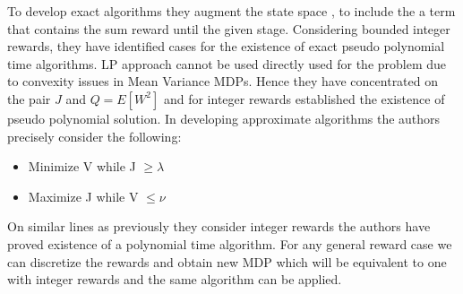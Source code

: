 \documentclass[12pt,a4paper,oneside]{report}
\begin{document}
To develop exact algorithms they augment the state space , to include the a term that contains the sum reward until the given stage. Considering bounded integer rewards, they have identified cases for the existence of exact pseudo polynomial time algorithms.  LP approach cannot be used directly used for the problem due to convexity issues in Mean Variance MDPs. Hence they have concentrated on the pair $J$ and $Q = E[W^2]$ and for integer rewards established the existence of pseudo polynomial solution.
In developing approximate algorithms the authors precisely consider the following:
\begin{itemize}
\item Minimize V while J $\geq \lambda$
\item Maximize J while V $\leq \nu$
\end{itemize}
On similar lines as previously they consider integer rewards the authors have proved existence of a polynomial time algorithm. For any general reward case we can discretize the rewards and obtain new MDP which will be equivalent to one with integer rewards and the same algorithm can be applied.\\
\end{document}
